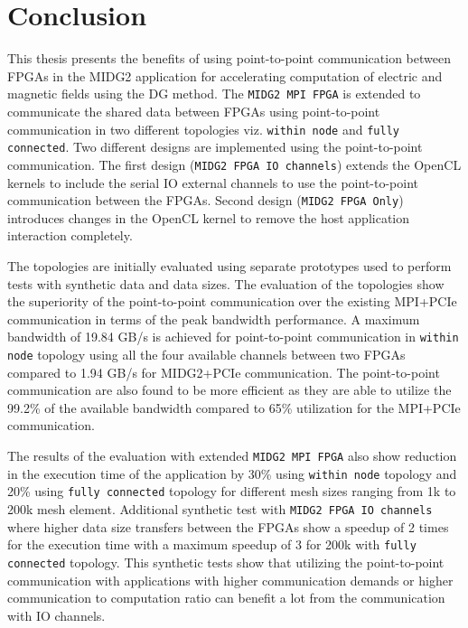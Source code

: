 \chapter{Conclusion}
\label{cha:Conclusion}

This thesis presents the benefits of using point-to-point communication between
FPGAs in the MIDG2 application for accelerating computation of electric and magnetic
fields using the \acl{DG} method. The \texttt{MIDG2 MPI FPGA} is extended to communicate
the shared data between FPGAs using point-to-point communication in two different
topologies viz. \texttt{within node} and \texttt{fully connected}. Two different
designs are implemented using the point-to-point communication. The first design
(\texttt{MIDG2 FPGA IO channels}) extends the OpenCL kernels to include the serial IO external channels to use
the point-to-point communication between the FPGAs. Second design (\texttt{MIDG2 FPGA Only})
introduces changes in the OpenCL kernel to remove the host application interaction completely.

The topologies are initially evaluated using separate prototypes used to perform
tests with synthetic data and data sizes. The evaluation of the topologies
show the superiority of the point-to-point communication over the existing
MPI+PCIe communication in terms of the peak bandwidth performance. A maximum
bandwidth of 19.84 GB/s is achieved for point-to-point communication in
\texttt{within node} topology using all the four available channels between
two FPGAs compared to 1.94 GB/s for MIDG2+PCIe communication. The point-to-point
communication are also found to be more efficient as they are able to utilize the
99.2\% of the available bandwidth compared to 65\% utilization for the MPI+PCIe
communication.

The results of the evaluation with extended \texttt{MIDG2 MPI FPGA} also show
reduction in the execution time of the application by 30\% using \texttt{within node} topology
and 20\% using \texttt{fully connected} topology for different mesh sizes ranging
from 1k to 200k mesh element. Additional synthetic test with \texttt{MIDG2 FPGA IO channels}
where higher data size transfers between the FPGAs show a speedup of 2 times for the execution
time with a maximum speedup of 3 for 200k with \texttt{fully connected} topology. This synthetic tests
show that utilizing the point-to-point communication with applications with higher communication
demands or higher communication to computation ratio can benefit a lot from the communication with
IO channels.

